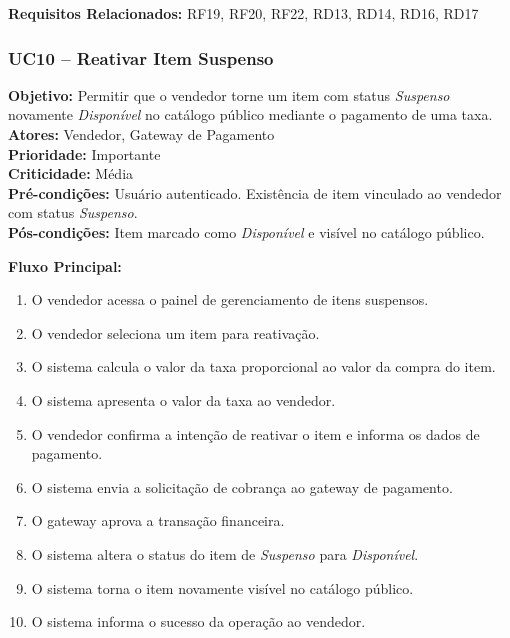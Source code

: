 ﻿\documentclass[12pt,a4paper]{article}
\begin{document}
\vspace{0.5em}
\noindent\textbf{Requisitos Relacionados:} RF19, RF20, RF22, RD13, RD14, RD16, RD17


\subsubsection{UC10 – Reativar Item Suspenso}
\label{uc:10}
\noindent\textbf{Objetivo:} Permitir que o vendedor torne um item com status \textit{Suspenso} novamente \textit{Disponível} no catálogo público mediante o pagamento de uma taxa.\\
\textbf{Atores:} Vendedor, Gateway de Pagamento\\
\textbf{Prioridade:} Importante\\
\textbf{Criticidade:} Média\\
\textbf{Pré-condições:} Usuário autenticado. Existência de item vinculado ao vendedor com status \textit{Suspenso}.\\
\textbf{Pós-condições:} Item marcado como \textit{Disponível} e visível no catálogo público.

\vspace{0.5em}
\noindent\textbf{Fluxo Principal:}
\begin{enumerate}[label=\arabic*.]
    \item O vendedor acessa o painel de gerenciamento de itens suspensos.
    \item O vendedor seleciona um item para reativação.
    \item O sistema calcula o valor da taxa proporcional ao valor da compra do item.
    \item O sistema apresenta o valor da taxa ao vendedor.
    \item O vendedor confirma a intenção de reativar o item e informa os dados de pagamento.
    \item O sistema envia a solicitação de cobrança ao gateway de pagamento.
    \item O gateway aprova a transação financeira.
    \item O sistema altera o status do item de \textit{Suspenso} para \textit{Disponível}.
    \item O sistema torna o item novamente visível no catálogo público.
    \item O sistema informa o sucesso da operação ao vendedor.
\end{enumerate}
\end{document}
